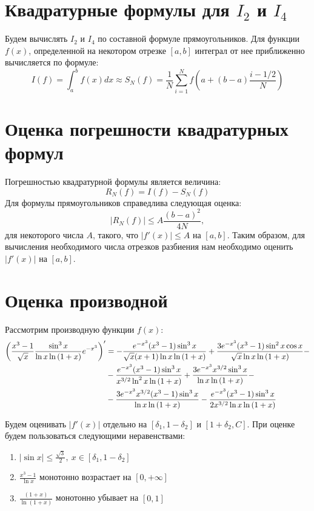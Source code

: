 \documentclass[titlepage]{article}
\def\l{\left}
\def\r{\right}
\def\le{\leqslant}
\begin{document}
\section{Квадратурные формулы для $I_2$ и $I_4$}
Будем вычислять $I_2$ и $I_4$ по составной формуле прямоугольников. Для функции $f(x)$, определенной на некотором отрезке $[a,b]$ интеграл от нее приближенно вычисляется по формуле:
$$I(f) = \int_{a}^{b}{f(x)dx} \approx S_N(f) = \frac{1}{N}\sum_{i=1}^{N}{f\l(a+(b-a)\frac{i-1/2}{N}\r)}$$

\section{Оценка погрешности квадратурных формул}
Погрешностью квадратурной формулы является величина:
$$R_N(f) = I(f) - S_N(f)$$
Для формулы прямоугольников справедлива следующая оценка:
$$\l|R_N(f)\r| \le A\frac{(b-a)^2}{4N},$$
для некоторого числа $A$, такого, что $\l|f'(x)\r| \le A$ на $[a,b]$. Таким образом, для вычисления необходимого числа отрезков разбиения нам необходимо оценить $\l|f'(x)\r|$ на $[a,b]$.

\section{Оценка производной}
Рассмотрим производную функции $f(x)$:
\begin{align}
	\notag \l(\frac{x^3-1}{\sqrt{x}}\frac{\sin^3{x}}{\ln{x}\ln{(1+x)}}e^{-x^3}\r)' &= -\frac{e^{-x^3}(x^3-1)\sin^3{x}}{\sqrt{x}(x+1)\ln{x}\ln{(1+x)}} + \frac{3e^{-x^3}(x^3-1)\sin^2{x}\cos{x}}{\sqrt{x}\ln{x}\ln{(1+x)}} - \\
	\notag &- \frac{e^{-x^3}(x^3-1)\sin^3{x}}{x^{3/2}\ln^2{x}\ln{(1+x)}} + \frac{3e^{-x^3}x^{3/2}\sin^3{x}}{\ln{x}\ln{(1+x)}} - \\
	\notag &- \frac{3e^{-x^3}x^{3/2}(x^3-1)\sin^3{x}}{\ln{x}\ln{(1+x)}} - \frac{e^{-x^3}(x^3-1)\sin^3{x}}{2x^{3/2}\ln{x}\ln{(1+x)}}
\end{align}

Будем оценивать $\l|f'(x)\r|$ отдельно на $[\delta_1, 1-\delta_2]$ и $[1+\delta_2, C]$. При оценке будем пользоваться следующими неравенствами:
\begin{enumerate}
	\item $|\sin{x}| \le \frac{\sqrt{3}}{2}, \ x \in [\delta_1, 1-\delta_2]$
	\item $\frac{x^3-1}{\ln{x}}$ монотонно возрастает на $[0,+\infty]$	
	\item $\frac{(1+x)}{\ln{(1+x)}}$ монотонно убывает на $[0,1]$
\end{enumerate}
\end{document}

